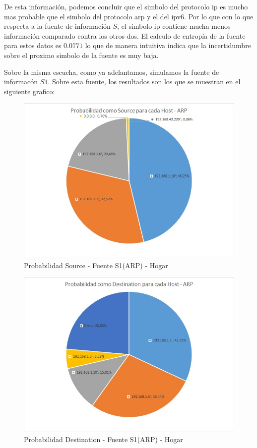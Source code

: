 De esta información, podemos concluir que el simbolo del protocolo ip es mucho mas probable que el simbolo del protocolo arp y el del ipv6. Por lo que con lo que respecta a la fuente de información $S$, el simbolo ip contiene mucha menos información comparado contra los otros dos. El calculo de entropía de la fuente para estos datos es $0.0771$ lo que de manera intuitiva indica que la incertidumbre sobre el proximo simbolo de la fuente es muy baja.

Sobre la misma escucha, como ya adelantamos, simulamos la fuente de informacón $S1$. Sobre esta fuente, los resultados son los que se muestran en el siguiente grafico:

\begin{figure}[h!]
\centering
\includegraphics[width=\textwidth]{./img/proba_src_casa.jpg}
\caption{Probabilidad Source - Fuente S1(ARP) - Hogar}
\end{figure}

\begin{figure}[h!]
\centering
\includegraphics[width=\textwidth]{./img/proba_dst_casa.jpg}
\caption{Probabilidad Destination - Fuente S1(ARP) - Hogar}
\end{figure}
\newpage

